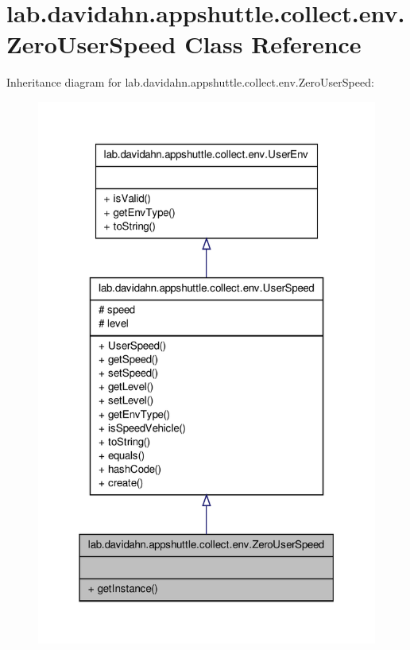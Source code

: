 \hypertarget{classlab_1_1davidahn_1_1appshuttle_1_1collect_1_1env_1_1_zero_user_speed}{\section{lab.\-davidahn.\-appshuttle.\-collect.\-env.\-Zero\-User\-Speed \-Class \-Reference}
\label{classlab_1_1davidahn_1_1appshuttle_1_1collect_1_1env_1_1_zero_user_speed}
}


\-Inheritance diagram for lab.\-davidahn.\-appshuttle.\-collect.\-env.\-Zero\-User\-Speed\-:
\nopagebreak
\begin{figure}[H]
\begin{center}
\leavevmode
\includegraphics[width=320pt]{classlab_1_1davidahn_1_1appshuttle_1_1collect_1_1env_1_1_zero_user_speed__inherit__graph}
\end{center}
\end{figure}


